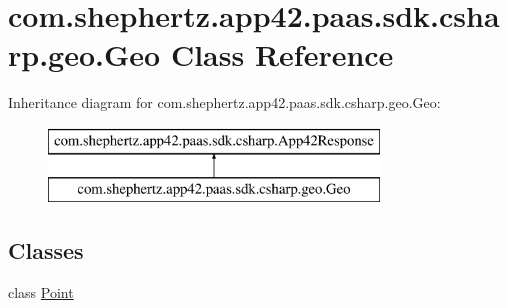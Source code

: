 \hypertarget{classcom_1_1shephertz_1_1app42_1_1paas_1_1sdk_1_1csharp_1_1geo_1_1_geo}{\section{com.\+shephertz.\+app42.\+paas.\+sdk.\+csharp.\+geo.\+Geo Class Reference}
\label{classcom_1_1shephertz_1_1app42_1_1paas_1_1sdk_1_1csharp_1_1geo_1_1_geo}
}
Inheritance diagram for com.\+shephertz.\+app42.\+paas.\+sdk.\+csharp.\+geo.\+Geo\+:\begin{figure}[H]
\begin{center}
\leavevmode
\includegraphics[height=2.000000cm]{classcom_1_1shephertz_1_1app42_1_1paas_1_1sdk_1_1csharp_1_1geo_1_1_geo}
\end{center}
\end{figure}
\subsection*{Classes}
\begin{DoxyCompactItemize}
\item 
class \hyperlink{classcom_1_1shephertz_1_1app42_1_1paas_1_1sdk_1_1csharp_1_1geo_1_1_geo_1_1_point}{Point}
\end{DoxyCompactItemize}
